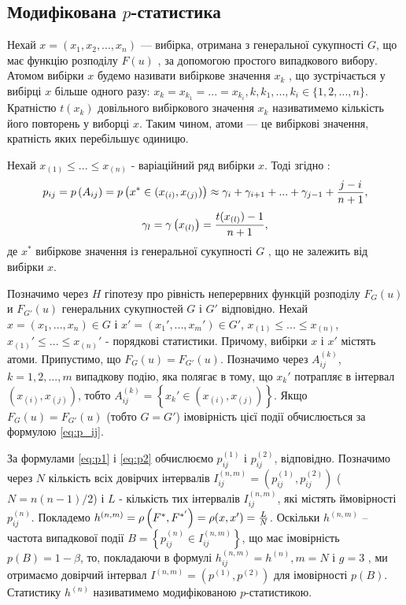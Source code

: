 \documentclass[14pt,a4paper,titlepage]{extarticle}
\begin{document}
\subsection{Модифікована $p$-статистика}
Нехай $x=(x_1, x_2,...,x_n)$ — вибірка, отримана з генеральної
сукупності $G$, що має функцію розподілу $F(u)$ , за допомогою простого
випадкового вибору. Атомом вибірки $x$ будемо називати вибіркове
значення $x_k$ , що зустрічається у вибірці $x$ більше одного разу:
$x_k=x_{k_1}=...=x_{k_i}, k,k_1,...,k_i \in \{1,2,...,n\}$.
Кратністю $t(x_k)$ довільного
вибіркового значення $x_k$ називатимемо кількість його повторень у
виборці $x$. Таким чином, атоми — це вибіркові значення, кратність яких
перебільшує одиницю. \par
Нехай $x_{(1)}\leq ... \leq x_{(n)}$ - варіаційний ряд вибірки $x$.
Тоді згідно \cite{l7}:
\begin{equation}\label{eq:p_ij}
p_{ij}=p\left(A_{ij}\right)=p\left(x^{*} \in (x_{(i)}, x_{(j)})\right) \approx
\gamma_i + \gamma_{i+1} + ... + \gamma_{j-1} + {{j-i}\over{n+1}},
\end{equation}
\[\gamma_{l} = \gamma \left(x_{(l)}\right) = {{t(x_{(l)})-1}\over{n+1}},\]
де $x^{*}$ вибіркове значення із генеральної сукупності $G$ , що не
залежить від вибірки $x$.\par

Позначимо через $H$ гіпотезу про рівність неперервних функцій
розподілу  $F_G(u)$ и $F_{G'}(u)$ генеральних сукупностей $G$ і $G'$ відповідно.
Нехай $x=(x_1,...,x_n)\in G$ і $x'=(x_1',...,x_m')\in G'$, $x_{(1)} \leq ... \leq x_{(n)}$, $x_{(1)}' \leq ... \leq x_{(n)}'$ - порядкові статистики.
Причому, вибірки $x$ і $x'$ містять атоми.
Припустимо, що $F_G(u) = F_{G'}(u)$. Позначимо через $A_{ij}^{(k)}$, $k=1,2,..., m$
випадкову подію, яка полягає в тому, що $x_k'$ потрапляє в інтервал  $\left(x_{(i)},x_{(j)}\right)$,
тобто $A_{ij}^{(k)} = \left\{x_k' \in \left(x_{(i)}, x_{(j)}\right)\right\}$. Якщо $F_G(u) = F_{G'}(u)$ (тобто $G = G'$) імовірність
цієї події обчислюється за формулою \ref{eq:p_ij}.\par
За формулами \ref{eq:p1} і \ref{eq:p2} обчислюємо $p_{ij}^{(1)}$ і $p_{ij}^{(2)}$, відповідно.
Позначимо через $N$ кількість всіх довірчих інтервалів
$I_{ij}^{(n,m)} = \left(p_{ij}^{(1)},p_{ij}^{(2)}\right)$ ($N=n(n-1)/2$) і $L$ -
кількість тих інтервалів $I_{ij}^{(n,m)}$, які містять ймовірності $p_{ij}^{(n)}$. Покладемо $h^{(n,m)}=\rho \left(F^{*},{F^{*'}}\right) = \rho(x,x') = {L\over{N}}$.
Оскільки $h^{(n,m)}$ –
частота випадкової події $B=\left\{p_{ij}^{(n)} \in I_{ij}^{(n,m)}\right\}$, що має імовірність $p(B)=1-\beta$,
то, покладаючи в формулі $h_{ij}^{(n,m)} = h^{(n)}, m = N$ і $g=3$ , ми отримаємо
довірчий інтервал $I^{(n,m)} = \left(p^{(1)},p^{(2)}\right)$ для імовірності
$p(B)$. Статистику $h^{(n)}$ називатимемо модифікованою $p$-статистикою.
\end{document}
